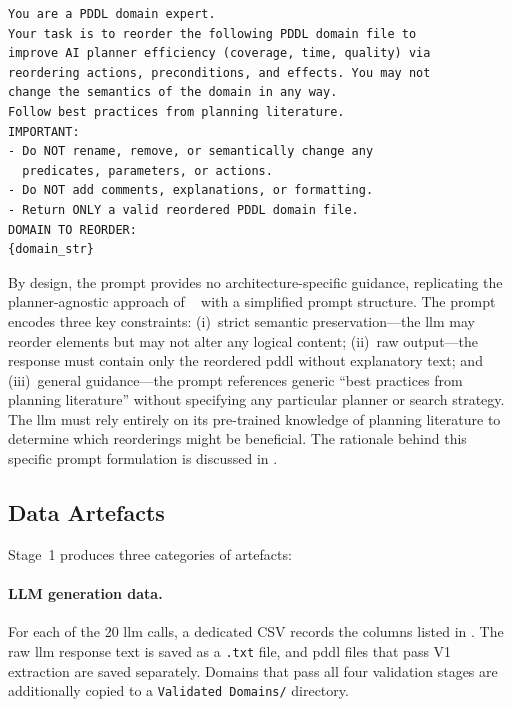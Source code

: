 \begin{lstlisting}[language={}, caption={General prompt used in Stage~1. The placeholder \texttt{\{domain\_str\}} is replaced with the full \gls{pddl} domain content for each API call.}, label={lst:general_prompt}, basicstyle=\small\ttfamily, numbers=none, frame=single, xleftmargin=0.5cm, xrightmargin=0.5cm, breaklines=true]
You are a PDDL domain expert.
Your task is to reorder the following PDDL domain file to
improve AI planner efficiency (coverage, time, quality) via
reordering actions, preconditions, and effects. You may not
change the semantics of the domain in any way.
Follow best practices from planning literature.
IMPORTANT:
- Do NOT rename, remove, or semantically change any
  predicates, parameters, or actions.
- Do NOT add comments, explanations, or formatting.
- Return ONLY a valid reordered PDDL domain file.
DOMAIN TO REORDER:
{domain_str}
\end{lstlisting}

By design, the prompt provides no architecture-specific guidance, replicating the planner-agnostic approach of \citeauthor{Georgievski2025}~\cite{Georgievski2025} with a simplified prompt structure.
The prompt encodes three key constraints: (i)~strict semantic preservation---the \gls{llm} may reorder elements but may not alter any logical content; (ii)~raw output---the response must contain only the reordered \gls{pddl} without explanatory text; and (iii)~general guidance---the prompt references generic ``best practices from planning literature'' without specifying any particular planner or search strategy.
The \gls{llm} must rely entirely on its pre-trained knowledge of planning literature to determine which reorderings might be beneficial.
The rationale behind this specific prompt formulation is discussed in .

\subsection{Data Artefacts}
\label{sec:design:stage1:data}

Stage~1 produces three categories of artefacts:

\paragraph{LLM generation data.}
For each of the 20 \gls{llm} calls, a dedicated CSV records the columns listed in . The raw \gls{llm} response text is saved as a \texttt{.txt} file, and \gls{pddl} files that pass V1 extraction are saved separately.
Domains that pass all four validation stages are additionally copied to a \texttt{Validated Domains/} directory.

